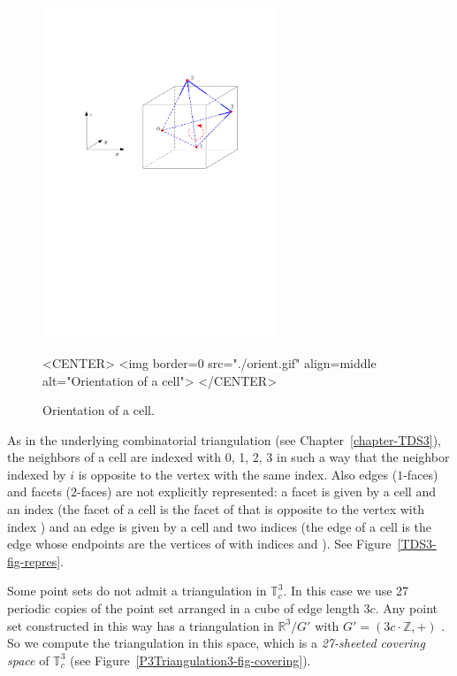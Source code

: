 \begin{figure}[htbp]
\begin{ccTexOnly}
\begin{center} 
\includegraphics[width=7cm]{Periodic_3_triangulation_3/orient} 
\end{center}
\end{ccTexOnly}
\begin{ccHtmlOnly}
<CENTER>
<img border=0 src="./orient.gif" align=middle alt="Orientation of a cell">
</CENTER>
\end{ccHtmlOnly}
\caption{Orientation of a cell.
\label{P3Triangulation3-fig-orient}}
\end{figure} 

As in the underlying combinatorial triangulation (see
Chapter~\ref{chapter-TDS3}), the neighbors of a cell are indexed with
0, 1, 2, 3 in such a way that the neighbor indexed by $i$ is opposite
to the vertex with the same index. Also edges ($1$-faces) and facets
($2$-faces) are not explicitly represented: a facet is given by a cell
and an index (the facet  of a cell  is the facet of
 that is opposite to the vertex with index ) and an edge
is given by a cell and two indices (the edge  of a cell
 is the edge whose endpoints are the vertices of  with
indices  and ). See Figure~\ref{TDS3-fig-repres}.  

Some point sets do not admit a triangulation in $\mathbb T_c^3$. In
this case we use 27 periodic copies of the point set arranged in a
cube of edge length $3c$. Any point set constructed in this way has a
triangulation in $\mathbb R^3/G'$ with $G'=(3c\cdot\mathbb Z,+)$
\cite{cgal:ct-c3dpt-09}. So we compute the triangulation in this
space, which is a \emph{27-sheeted covering space} of $\mathbb T_c^3$
(see Figure~\ref{P3Triangulation3-fig-covering}).

